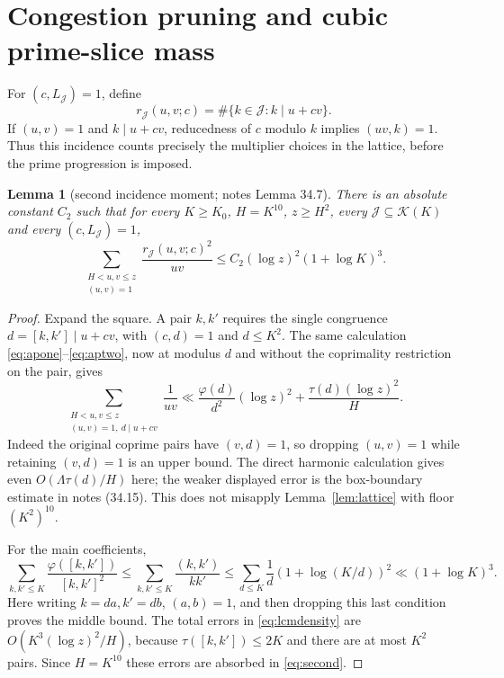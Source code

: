 \documentclass[10pt,reqno]{amsart}
\newtheorem{lemma}[theorem]{Lemma}
\theoremstyle{remark}
\newcommand{\K}{\mathcal K}
\newcommand{\J}{\mathcal J}
\begin{document}
\section{Congestion pruning and cubic prime-slice mass}\label{sec:harvest}
For $(c,L_{\J})=1$, define
\[
 r_{\J}(u,v;c)=\#\{k\in\J:k\mid u+cv\}.
\]
If $(u,v)=1$ and $k\mid u+cv$, reducedness of $c$ modulo $k$ implies
$(uv,k)=1$.  Thus this incidence counts precisely the multiplier choices
in the lattice, before the prime progression is imposed.

\begin{lemma}[second incidence moment; notes Lemma 34.7]\label{lem:congestion}
There is an absolute constant $C_2$ such that for every $K\geq K_0$,
$H=K^{10}$, $z\geq H^2$, every $\J\subseteq\K(K)$ and every
$(c,L_{\J})=1$,
\begin{equation}\label{eq:second}
 \sum_{\substack{H<u,v\leq z\\(u,v)=1}}\frac{r_{\J}(u,v;c)^2}{uv}
 \leq C_2(\log z)^2(1+\log K)^3.
\end{equation}
\end{lemma}
\begin{proof}
Expand the square.  A pair $k,k'$ requires the single congruence
$d=[k,k']\mid u+cv$, with $(c,d)=1$ and $d\leq K^2$.
The same calculation \eqref{eq:apone}--\eqref{eq:aptwo}, now at modulus
$d$ and without the coprimality restriction on the pair, gives
\begin{equation}\label{eq:lcmdensity}
 \sum_{\substack{H<u,v\leq z\\(u,v)=1,\ d\mid u+cv}}\frac1{uv}
 \ll\frac{\varphi(d)}{d^2}(\log z)^2+
                       \frac{\tau(d)(\log z)^2}{H}.
\end{equation}
Indeed the original coprime pairs have $(v,d)=1$, so dropping $(u,v)=1$
while retaining $(v,d)=1$ is an upper bound.  The direct harmonic
calculation gives even $O(\Lambda\tau(d)/H)$ here; the weaker displayed
error is the box-boundary estimate in notes (34.15).  This does not
misapply Lemma~\ref{lem:lattice} with floor $(K^2)^{10}$.

For the main coefficients,
\[
 \sum_{k,k'\leq K}\frac{\varphi([k,k'])}{[k,k']^2}
 \leq\sum_{k,k'\leq K}\frac{(k,k')}{kk'}
 \leq\sum_{d\leq K}\frac1d(1+\log(K/d))^2
 \ll(1+\log K)^3.
\]
Here writing $k=da,k'=db$, $(a,b)=1$, and then dropping this last
condition proves the middle bound.  The total errors in
\eqref{eq:lcmdensity} are $O(K^3(\log z)^2/H)$, because
$\tau([k,k'])\leq2K$ and there are at most $K^2$ pairs.
Since $H=K^{10}$ these errors are absorbed in \eqref{eq:second}.
\end{proof}
\end{document}
